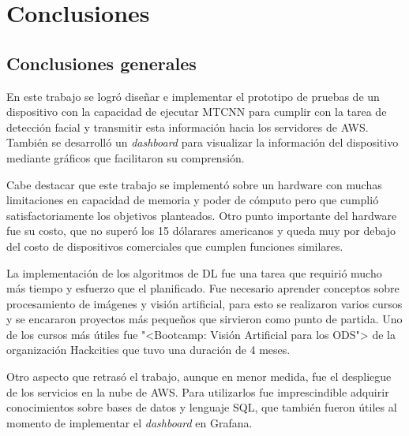 
\chapter{Conclusiones} %

\label{Chapter5} %




\section{Conclusiones generales }
En este trabajo se logró diseñar e implementar el prototipo de pruebas de un dispositivo con la capacidad de ejecutar MTCNN para cumplir con la tarea de detección facial y transmitir esta información hacia los servidores de AWS. También se desarrolló un \textit{dashboard} para visualizar la información del dispositivo mediante gráficos que facilitaron su comprensión.

Cabe destacar que este trabajo se implementó sobre un hardware con muchas limitaciones en capacidad de memoria y poder de cómputo pero que cumplió satisfactoriamente los objetivos planteados. Otro punto importante del hardware fue su costo, que no superó los 15 dólarares americanos y queda muy por debajo del costo de dispositivos comerciales que cumplen funciones similares.

La implementación de los algoritmos de DL fue una tarea que requirió mucho más tiempo y esfuerzo que el planificado. Fue necesario aprender conceptos sobre procesamiento de imágenes y visión artificial, para esto se realizaron varios cursos y se encararon proyectos más pequeños que sirvieron como punto de partida. Uno de los cursos más útiles fue "<Bootcamp: Visión Artificial para los ODS"> de la organización Hackcities que tuvo una duración de 4 meses.

Otro aspecto que retrasó el trabajo, aunque en menor medida, fue el despliegue de los servicios en la nube de AWS. Para utilizarlos fue imprescindible adquirir conocimientos sobre bases de datos y lenguaje SQL, que también fueron útiles al momento de implementar el \textit{dashboard} en Grafana.

